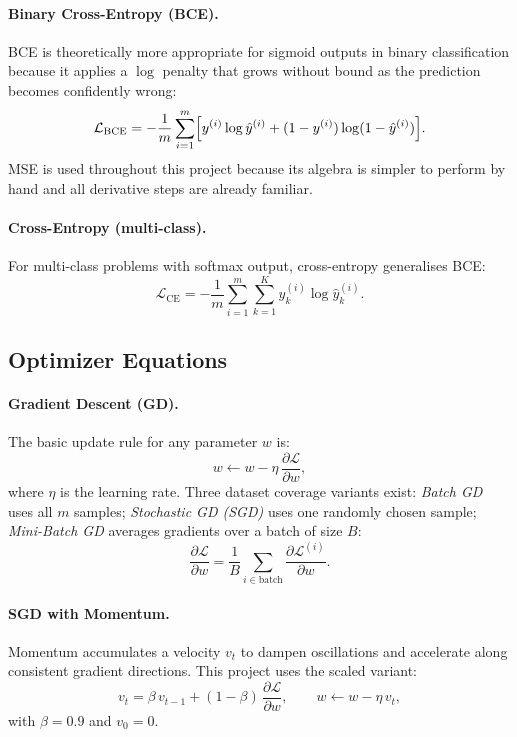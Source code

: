 \documentclass[runningheads]{llncs}
\begin{document}
\paragraph{Binary Cross-Entropy (BCE).}
BCE is theoretically more appropriate for sigmoid outputs in binary
classification because it applies a $\log$ penalty that grows without bound as
the prediction becomes confidently wrong:
\begin{equation}
  \mathcal{L}_{\text{BCE}} = -\frac{1}{m}\sum_{i=1}^{m}
  \Bigl[y^{(i)}\log\hat{y}^{(i)} + (1-y^{(i)})\log(1-\hat{y}^{(i)})\Bigr].
\end{equation}
MSE is used throughout this project because its algebra is simpler to perform
by hand and all derivative steps are already familiar.

\paragraph{Cross-Entropy (multi-class).}
For multi-class problems with softmax output, cross-entropy generalises BCE:
\begin{equation}
  \mathcal{L}_{\text{CE}} = -\frac{1}{m}\sum_{i=1}^{m}\sum_{k=1}^{K}
  y_k^{(i)}\log\hat{y}_k^{(i)}.
\end{equation}

\subsection{Optimizer Equations}
\label{sec:optimizers_theory}

\paragraph{Gradient Descent (GD).}
The basic update rule for any parameter $w$ is:
\begin{equation}
  w \leftarrow w - \eta\,\frac{\partial\mathcal{L}}{\partial w},
\end{equation}
where $\eta$ is the learning rate. Three dataset coverage variants exist:
\emph{Batch GD} uses all $m$ samples; \emph{Stochastic GD (SGD)} uses one
randomly chosen sample; \emph{Mini-Batch GD} averages gradients over a batch
of size $B$:
\begin{equation}
  \frac{\partial\mathcal{L}}{\partial w} = \frac{1}{B}
  \sum_{i\in\text{batch}}\frac{\partial\mathcal{L}^{(i)}}{\partial w}.
\end{equation}

\paragraph{SGD with Momentum.}
Momentum accumulates a velocity $v_t$ to dampen oscillations and accelerate
along consistent gradient directions. This project uses the scaled variant:
\begin{equation}
  v_t = \beta\, v_{t-1} + (1-\beta)\,\frac{\partial\mathcal{L}}{\partial w},
  \qquad w \leftarrow w - \eta\, v_t,
\end{equation}
with $\beta = 0.9$ and $v_0 = 0$.
\end{document}
